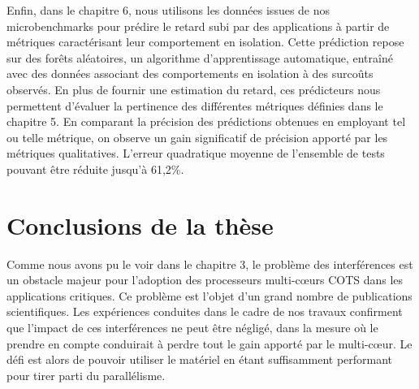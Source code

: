 Enfin, dans le chapitre 6, nous utilisons les données issues de nos microbenchmarks pour prédire le retard subi par des applications à partir de métriques caractérisant leur comportement en isolation.
Cette prédiction repose sur des forêts aléatoires, un algorithme d'apprentissage automatique, entraîné avec des données associant des comportements en isolation à des surcoûts observés.
En plus de fournir une estimation du retard, ces prédicteurs nous permettent d'évaluer la pertinence des différentes métriques définies dans le chapitre 5.
En comparant la précision des prédictions obtenues en employant tel ou telle métrique, on observe un gain significatif de précision apporté par les métriques qualitatives.
L'erreur quadratique moyenne de l'ensemble de tests pouvant être réduite jusqu'à 61,2\%.



\section{Conclusions de la thèse}
Comme nous avons pu le voir dans le chapitre 3, le problème des interférences est un obstacle majeur pour l'adoption des processeurs multi-cœurs COTS dans les applications critiques.
Ce problème est l'objet d'un grand nombre de publications scientifiques.
Les expériences conduites dans le cadre de nos travaux confirment que l'impact de ces interférences ne peut être négligé, dans la mesure où le prendre en compte conduirait à perdre tout le gain apporté par le multi-cœur.
Le défi est alors de pouvoir utiliser le matériel en étant suffisamment performant pour tirer parti du parallélisme.

